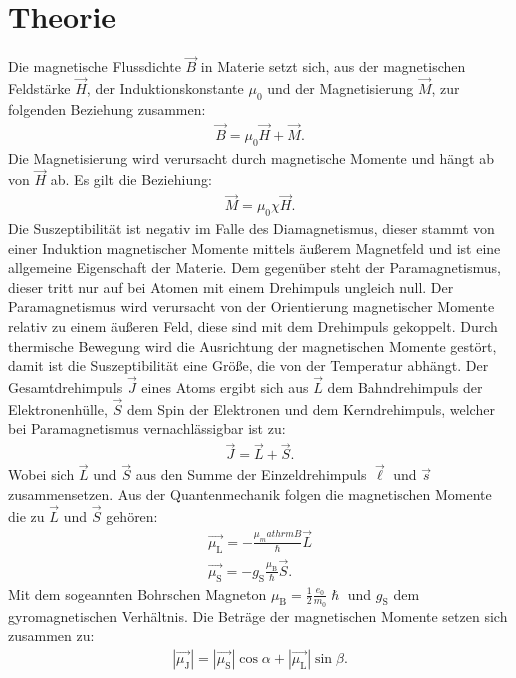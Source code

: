 \section{Theorie}
\label{sec:Theorie}
Die magnetische Flussdichte $\vec{B}$ in Materie setzt sich, aus der magnetischen Feldstärke $\vec{H}$,
der Induktionskonstante $\mu_\mathrm{0}$ und der Magnetisierung $\vec{M}$, zur
folgenden Beziehung zusammen:
\begin{align}
  \vec{B}=\mu_\mathrm{0}\vec{H}+\vec{M}.
\end{align}
Die Magnetisierung wird verursacht durch magnetische Momente und hängt ab
von $\vec{H}$ ab. Es gilt die Beziehiung:
\begin{align}
  \vec{M}=\mu_\mathrm{0}\chi\vec{H}.
\end{align}
Die Suszeptibilität ist negativ im Falle des Diamagnetismus,
dieser stammt von einer Induktion magnetischer Momente mittels äußerem
Magnetfeld und ist eine allgemeine Eigenschaft der Materie.
Dem gegenüber steht der Paramagnetismus, dieser tritt nur auf bei
Atomen mit einem Drehimpuls ungleich null. Der Paramagnetismus wird
verursacht von der Orientierung magnetischer Momente relativ
zu einem äußeren Feld, diese sind mit dem Drehimpuls gekoppelt.
Durch thermische Bewegung wird die Ausrichtung der magnetischen Momente
gestört, damit ist die Suszeptibilität eine Größe, die von der Temperatur
abhängt.
Der Gesamtdrehimpuls $\vec{J}$ eines Atoms ergibt sich aus
$\vec{L}$ dem Bahndrehimpuls der Elektronenhülle, $\vec{S}$ dem Spin
der Elektronen und dem Kerndrehimpuls, welcher bei Paramagnetismus
vernachlässigbar ist zu:
\begin{align}
  \vec{J}=\vec{L}+\vec{S}.
\end{align}
Wobei sich $\vec{L}$ und $\vec{S}$ aus den Summe der  Einzeldrehimpuls $\vec{\ell}$
und $\vec{s}$ zusammensetzen.
Aus der Quantenmechanik folgen die magnetischen Momente die zu $\vec{L}$ und $\vec{S}$
gehören:
\begin{align*}
  \vec{\mu_\mathrm{L}}=-\frac{\mu_mathrm{B}}{\hslash}\vec{L}\\
  \vec{\mu_\mathrm{S}}=-g_\mathrm{S}\frac{\mu_\mathrm{B}}{\hslash}\vec{S}.
\end{align*}
Mit dem sogeannten Bohrschen Magneton $\mu_\mathrm{B}=\frac{1}{2}\frac{e_0}{m_0}\hslash$
und $g_\mathrm{S}$ dem gyromagnetischen Verhältnis.
Die Beträge der magnetischen Momente setzen sich zusammen zu:
\begin{align}
  |\vec{\mu_\mathrm{J}}|=|\vec{\mu_\mathrm{S}}|\cos{\alpha}+|\vec{\mu_\mathrm{L}}|\sin{\beta}.
\end{align}
